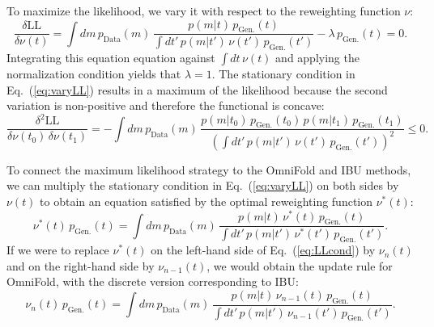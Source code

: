 \documentclass[prl,twocolumn,superscriptaddress,longbibliography,preprintnumbers,nofootinbib]{revtex4-1}
\DeclareRobustCommand{\Eq}[1]{Eq.~(\ref{eq:#1})}
\newcommand{\OmniFold}{{\sc OmniFold}\xspace}
\begin{document}
To maximize the likelihood, we vary it with respect to the reweighting function $\nu$:
\begin{equation}\label{eq:varyLL}
\frac{\delta \text{LL}}{\delta \nu(t)} = \int dm \, p_\text{Data}(m) \, \frac{p(m|t) \, p_\text{Gen.}(t)}{\int dt'\,p(m|t') \, \nu(t')\, p_\text{Gen.}(t')} - \lambda \, p_\text{Gen.}(t) = 0.
\end{equation}
%
Integrating this equation equation against $\int dt\, \nu(t)$ and applying the normalization condition yields that $\lambda=1$.
%
The stationary condition in \Eq{varyLL} results in a maximum of the likelihood because the second variation is non-positive and therefore the functional is concave:
%
\begin{equation}\label{eq:varyLL2}
\frac{\delta^2 \text{LL}}{\delta \nu(t_0) \, \delta \nu(t_1)} = -\int dm \, p_\text{Data}(m) \, \frac{p(m|t_0) \, p_\text{Gen.}(t_0) \, p(m|t_1) \, p_\text{Gen.}(t_1)}{\left(\int dt'\,p(m|t') \,\nu(t') \, p_\text{Gen.}(t')\right)^2} \le 0.
\end{equation}


To connect the maximum likelihood strategy to the \OmniFold and IBU methods, we can multiply the stationary condition in \Eq{varyLL} on both sides by $\nu(t)$ to obtain an equation satisfied by the optimal reweighting function $\nu^*(t)$:
%
\begin{equation}\label{eq:LLcond}
\nu^*(t) \, p_\text{Gen.}(t) = \int dm \, p_\text{Data}(m) \, \frac{p(m|t) \, \nu^*(t) \, p_\text{Gen.}(t)}{\int dt'\, p(m|t') \, \nu^*(t') \, p_\text{Gen.}(t')}.
\end{equation}
%
If we were to replace $\nu^*(t)$ on the left-hand side of \Eq{LLcond} by $\nu_n(t)$ and on the right-hand side by $\nu_{n-1}(t)$, we would obtain the update rule for \OmniFold, with the discrete version corresponding to IBU:
\begin{equation}\label{eq:iter}
\nu_n(t) \, p_\text{Gen.}(t) = \int dm \, p_\text{Data}(m) \, \frac{p(m|t) \, \nu_{n-1}(t) \, p_\text{Gen.}(t)}{\int dt'\, p(m|t') \, \nu_{n-1}(t') \, p_\text{Gen.}(t')}.
\end{equation}
\end{document}
